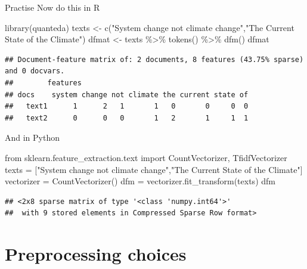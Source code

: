 \documentclass[
  10pt,
  ignorenonframetext,
  aspectratio=169]{beamer}
\newenvironment{Shaded}{\begin{snugshade}}{\end{snugshade}}
\newcommand{\FunctionTok}[1]{\textcolor[rgb]{0.94,0.94,0.56}{#1}}
\newcommand{\ImportTok}[1]{\textcolor[rgb]{0.80,0.80,0.80}{#1}}
\newcommand{\NormalTok}[1]{\textcolor[rgb]{0.80,0.80,0.80}{#1}}
\newcommand{\OperatorTok}[1]{\textcolor[rgb]{0.94,0.94,0.82}{#1}}
\newcommand{\OtherTok}[1]{\textcolor[rgb]{0.94,0.94,0.56}{#1}}
\newcommand{\SpecialCharTok}[1]{\textcolor[rgb]{0.86,0.64,0.64}{#1}}
\newcommand{\StringTok}[1]{\textcolor[rgb]{0.80,0.58,0.58}{#1}}
\begin{document}
\begin{frame}[fragile]{Practise}
\protect\hypertarget{practise}{}
Now do this in R

\scriptsize

\begin{Shaded}
\begin{Highlighting}[]
\FunctionTok{library}\NormalTok{(quanteda)}
\NormalTok{texts }\OtherTok{\textless{}{-}} \FunctionTok{c}\NormalTok{(}\StringTok{"System change not climate change"}\NormalTok{,}\StringTok{"The Current State of the Climate"}\NormalTok{)}
\NormalTok{dfmat }\OtherTok{\textless{}{-}}\NormalTok{ texts }\SpecialCharTok{\%\textgreater{}\%}
  \FunctionTok{tokens}\NormalTok{() }\SpecialCharTok{\%\textgreater{}\%}
  \FunctionTok{dfm}\NormalTok{()}
\NormalTok{dfmat}
\end{Highlighting}
\end{Shaded}

\begin{verbatim}
## Document-feature matrix of: 2 documents, 8 features (43.75% sparse) and 0 docvars.
##        features
## docs    system change not climate the current state of
##   text1      1      2   1       1   0       0     0  0
##   text2      0      0   0       1   2       1     1  1
\end{verbatim}

\normalsize

And in Python

\scriptsize

\begin{Shaded}
\begin{Highlighting}[]
\ImportTok{from}\NormalTok{ sklearn.feature\_extraction.text }\ImportTok{import}\NormalTok{ CountVectorizer, TfidfVectorizer}
\NormalTok{texts }\OperatorTok{=}\NormalTok{ [}\StringTok{"System change not climate change"}\NormalTok{,}\StringTok{"The Current State of the Climate"}\NormalTok{]}
\NormalTok{vectorizer }\OperatorTok{=}\NormalTok{ CountVectorizer()}
\NormalTok{dfm }\OperatorTok{=}\NormalTok{ vectorizer.fit\_transform(texts)}
\NormalTok{dfm}
\end{Highlighting}
\end{Shaded}

\begin{verbatim}
## <2x8 sparse matrix of type '<class 'numpy.int64'>'
##  with 9 stored elements in Compressed Sparse Row format>
\end{verbatim}
\end{frame}

\hypertarget{preprocessing-choices}{%
\section{Preprocessing choices}\label{preprocessing-choices}}
\end{document}
